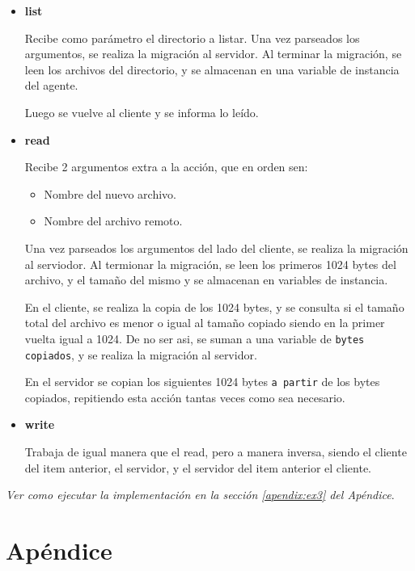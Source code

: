\documentclass[osajnl,twocolumn,showpacs,superscriptaddress,10pt]{revtex4-1} %
\begin{document}
\begin{itemize}
      \item \textbf{list}
      
      Recibe como parámetro el directorio a listar.
      Una vez parseados los argumentos, se realiza la migración al servidor. Al terminar la migración, se leen los archivos del directorio, y se almacenan en una variable de instancia del agente.
      
      Luego se vuelve al cliente y se informa lo leído.

      \item \textbf{read}
      
      Recibe 2 argumentos extra a la acción, que en orden sen: 
      \begin{itemize}
        \item Nombre del nuevo archivo.
        \item Nombre del archivo remoto.
      \end{itemize}
      
      Una vez parseados los argumentos del lado del cliente, se realiza la migración al serviodor. Al termionar la migración, se leen los primeros 1024 bytes del archivo, y el tamaño del mismo y se almacenan en variables de instancia.
      
      En el cliente, se realiza la copia de los 1024 bytes, y se consulta si el tamaño total del archivo es menor o igual al tamaño copiado siendo en la primer vuelta igual a 1024. De no ser asi, se suman a una variable de \texttt{bytes copiados}, y se realiza la migración al servidor.
      
      En el servidor se copian los siguientes 1024 bytes \texttt{a partir} de los bytes copiados, repitiendo esta acción tantas veces como sea necesario.

      \item \textbf{write}
      
      Trabaja de igual manera que el read, pero a manera inversa, siendo el cliente del item anterior, el servidor, y el servidor del item anterior el cliente.
\end{itemize}

\textit{Ver como ejecutar la implementación en la sección \ref{apendix:ex3} del Apéndice}. \\

\clearpage

\onecolumngrid

\section{Apéndice}
\end{document}
